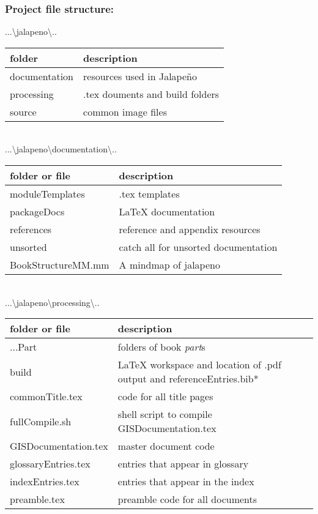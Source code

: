 \documentclass[class=book , crop=false]{standalone}
\begin{document}
\subsubsection{Project file structure:}
{\Large ...\textbackslash jalapeno\textbackslash..}\\
\begin{tabular}{p{4cm}| p{7cm} } 
folder & description \\ \hline 
documentation & resources used in Jalape\~no\\
processing & .tex douments and build folders\\
source & common image files\\
\end{tabular}
\bigskip\\
{\Large ...\textbackslash jalapeno\textbackslash documentation\textbackslash..}\\
\begin{tabular}{p{4cm} | p{7cm} } 
folder or file & description \\ \hline
moduleTemplates & .tex templates\\
packageDocs & \LaTeX{} documentation\\
references & reference and appendix resources\\
unsorted & catch all for unsorted documentation\\
BookStructureMM.mm & A mindmap of jalapeno\\
\end{tabular}
\bigskip\\
{\Large ...\textbackslash jalapeno\textbackslash processing\textbackslash..}\\
\begin{tabular}{p{4cm}| p{7cm} } 
folder or file & description \\ \hline
...Part & folders of book \textit{part}s\\
build & \LaTeX{} workspace and location of .pdf output and referenceEntries.bib* \\
commonTitle.tex & code for all title pages\\
fullCompile.sh & shell script to compile GISDocumentation.tex\\
GISDocumentation.tex & master document code\\
glossaryEntries.tex & entries that appear in glossary\\
indexEntries.tex & entries that appear in the index\\
preamble.tex & preamble code for all documents\\
\end{tabular}
\end{document}
